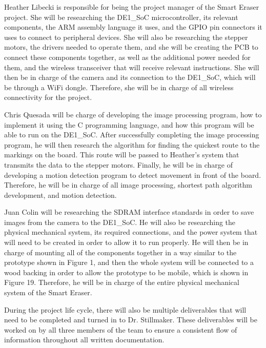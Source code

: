 \setlength{\parindent}{2.5ex} Heather Libecki is responsible for being the project manager of the Smart Eraser project. She will be researching the DE1\_SoC microcontroller, its relevant components, the ARM assembly language it uses, and the GPIO pin connectors it uses to connect to peripheral devices. She will also be researching the stepper motors, the drivers needed to operate them, and she will be creating the PCB to connect these components together, as well as the additional power needed for them, and the wireless transceiver that will receive relevant instructions. She will then be in charge of the camera and its connection to the DE1\_SoC, which will be through a WiFi dongle. Therefore, she will be in charge of all wireless connectivity for the project. \par
\setlength{\parindent}{2.5ex} Chris Quesada will be charge of developing the image processing program, how to implement it using the C programming language, and how this program will be able to run on the DE1\_SoC. After successfully completing the image processing program, he will then research the algorithm for finding the quickest route to the markings on the board. This route will be passed to Heather's system that transmits the data to the stepper motors.  Finally, he will be in charge of developing a motion detection program to detect movement in front of the board. Therefore, he will be in charge of all image processing, shortest path algorithm development, and motion detection.
 \par
\setlength{\parindent}{2.5ex} Juan Colin will be researching the SDRAM interface standards in order to save images from the camera to the DE1\_SoC. He will also be researching the physical mechanical system, its required connections, and the power system that will need to be created in order to allow it to run properly. He will then be in charge of mounting all of the components together in a way similar to the prototype shown in Figure 1, and then the whole system will be connected to a wood backing in order to allow the prototype to be mobile, which is shown in Figure 19. Therefore, he will be in charge of the entire physical mechanical system of the Smart Eraser.
 \par
\setlength{\parindent}{2.5ex}During the project life cycle, there will also be multiple deliverables that will need to be completed and turned in to Dr. Stillmaker. These deliverables will be worked on by all three members of the team to ensure a consistent flow of information throughout all written documentation.
 
